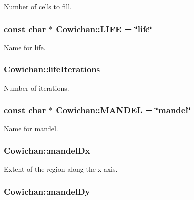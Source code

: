 Number of cells to fill. \hypertarget{class_cowichan_6d8355328c9a2e36321d3d33930f56b2}{
\subsubsection[{LIFE}]{\setlength{\rightskip}{0pt plus 5cm}const char $\ast$ {\bf Cowichan::LIFE} = \char`\"{}life\char`\"{}}}
\label{class_cowichan_6d8355328c9a2e36321d3d33930f56b2}


Name for life. \hypertarget{class_cowichan_edeb55a8b961f270ec35869dbba3afde}{
\subsubsection[{lifeIterations}]{ {\bf Cowichan::lifeIterations}}}
\label{class_cowichan_edeb55a8b961f270ec35869dbba3afde}


Number of iterations. \hypertarget{class_cowichan_40d3f57ec83c7c1ec3af94c37d849049}{
\subsubsection[{MANDEL}]{\setlength{\rightskip}{0pt plus 5cm}const char $\ast$ {\bf Cowichan::MANDEL} = \char`\"{}mandel\char`\"{}}}
\label{class_cowichan_40d3f57ec83c7c1ec3af94c37d849049}


Name for mandel. \hypertarget{class_cowichan_edde2560c73a48dd44ea52c6a42c8649}{
\subsubsection[{mandelDx}]{ {\bf Cowichan::mandelDx}}}
\label{class_cowichan_edde2560c73a48dd44ea52c6a42c8649}


Extent of the region along the x axis. \hypertarget{class_cowichan_7189d7127e740a2e6b14dcf0e757a500}{
\subsubsection[{mandelDy}]{ {\bf Cowichan::mandelDy}}}
\label{class_cowichan_7189d7127e740a2e6b14dcf0e757a500}


